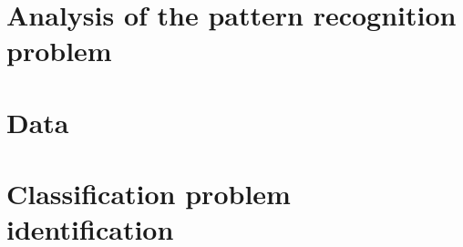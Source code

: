 \chapter{Analysis of the pattern recognition problem}
\chapter{Data}
\chapter{Classification problem identification}


